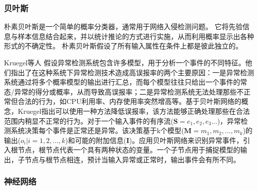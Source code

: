 


\subsubsection{贝叶斯}

朴素贝叶斯是一个简单的概率分类器，通常用于网络入侵检测问题。 它将先验信息与样本信息结合起来，并以统计推论的方式进行实施，从而利用概率显示出各种形式的不确定性。 朴素贝叶斯假设了所有输入属性在条件上都是彼此独立的。

Kruegel等人\cite{kruegel2003bayesian} 假设异常检测系统包含许多模型，用于分析一个事件的不同特征。他们指出了在这种系统下异常检测技术造成高误报率的两个主要原因：一是异常检测系统通过将多个概率模型的输出进行汇总，而每个模型往往只给出一个事件的常态/异常的得分或概率，从而导致高误报率；二是异常检测系统无法处理那些不正常但合法的行为，如CPU利用率、内存使用率突然增高等。基于贝叶斯网络的概念，Kruegel\citep{kruegel2003bayesian}指出可以使用一种方法降低误报率，该方法能够正确处理那些在合法范围内稍显不正常的行为。对于一个输入事件的有序流($\symbf{S}=e_1,e_2,e_3...$)，异常检测系统决策每个事件是正常还是异常。该决策基于k个模型($\symbf{M}=m_1,m_2,...,m_k$)的输出($o_i|i=1,2,...,k$)和可能的附加信息($\symbf{I}$)。应用贝叶斯网络来识别异常事件，引入根节点，根节点代表一个具有两种状态的变量。一个子节点用于捕捉模型的输出，子节点与根节点相连，预计当输入异常或正常时，输出事件会有所不同。

\subsubsection{神经网络}

